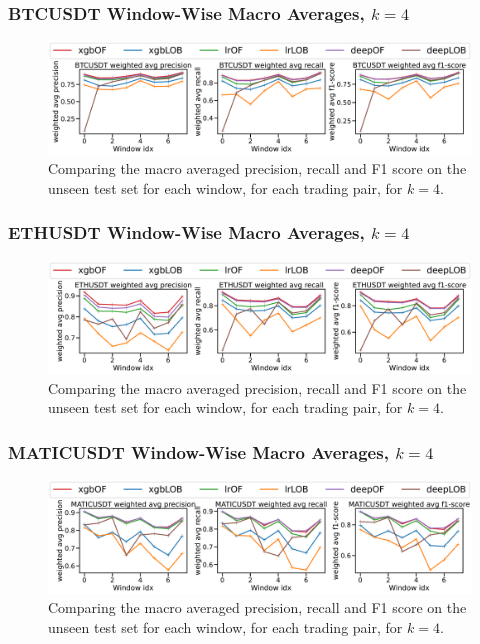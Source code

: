 \documentclass[handout]{beamer}
\begin{document}
\begin{frame}
    \frametitle{BTCUSDT Window-Wise Macro Averages, $k=4$}
    \begin{figure}[htpb!]
        \centering
        \includegraphics[width=1.0\textwidth]{./images/BTCUSDT_macro_results_k=4.pdf}
        \caption{Comparing the macro averaged precision, recall and F1 score on the unseen test set for each window, for each trading pair, for $k=4$.}
        
    \end{figure}
\end{frame}

\begin{frame}
    \frametitle{ETHUSDT Window-Wise Macro Averages, $k=4$}
    \begin{figure}[htpb!]
        \centering
        \includegraphics[width=1.0\textwidth]{./images/ETHUSDT_macro_results_k=4.pdf}
        \caption{Comparing the macro averaged precision, recall and F1 score on the unseen test set for each window, for each trading pair, for $k=4$.}
        
    \end{figure}
\end{frame}

\begin{frame}
    \frametitle{MATICUSDT Window-Wise Macro Averages, $k=4$}
    \begin{figure}[htpb!]
        \centering
        \includegraphics[width=1.0\textwidth]{./images/MATICUSDT_macro_results_k=4.pdf}
        \caption{Comparing the macro averaged precision, recall and F1 score on the unseen test set for each window, for each trading pair, for $k=4$.}
        
    \end{figure}
\end{frame}
\end{document}
